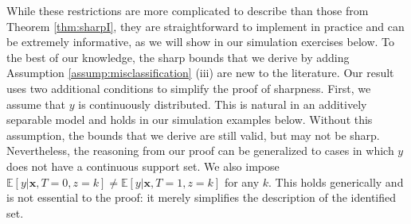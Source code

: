 While these restrictions are more complicated to describe than those from Theorem \ref{thm:sharpI}, they are straightforward to implement in practice and can be extremely informative, as we will show in our simulation exercises below.
To the best of our knowledge, the sharp bounds that we derive by adding Assumption \ref{assump:misclassification} (iii) are new to the literature.
Our result uses two additional conditions to simplify the proof of sharpness.
First, we assume that $y$ is continuously distributed.
This is natural in an additively separable model and holds in our simulation examples below. 
Without this assumption, the bounds that we derive are still valid, but may not be sharp. 
Nevertheless, the reasoning from our proof can be generalized to cases in which $y$ does not have a continuous support set.
We also impose $\mathbb{E}[y|\mathbf{x},T = 0, z=k] \neq \mathbb{E}[y|\mathbf{x},T=1, z=k]$ for any $k$.
This holds generically and is not essential to the proof: it merely simplifies the description of the identified set.




